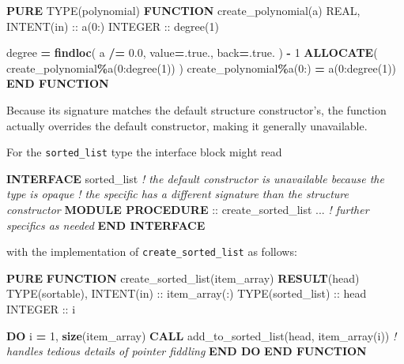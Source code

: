 \documentclass[
  paper=a4,
  ,captions=tableheading
]{scrartcl}
\newenvironment{Shaded}{\begin{snugshade}}{\end{snugshade}}
\newcommand{\CommentTok}[1]{\textcolor[rgb]{0.56,0.35,0.01}{\textit{#1}}}
\newcommand{\ConstantTok}[1]{\textcolor[rgb]{0.56,0.35,0.01}{#1}}
\newcommand{\DataTypeTok}[1]{\textcolor[rgb]{0.13,0.29,0.53}{#1}}
\newcommand{\DecValTok}[1]{\textcolor[rgb]{0.00,0.00,0.81}{#1}}
\newcommand{\FloatTok}[1]{\textcolor[rgb]{0.00,0.00,0.81}{#1}}
\newcommand{\FunctionTok}[1]{\textcolor[rgb]{0.13,0.29,0.53}{\textbf{#1}}}
\newcommand{\KeywordTok}[1]{\textcolor[rgb]{0.13,0.29,0.53}{\textbf{#1}}}
\newcommand{\NormalTok}[1]{#1}
\newcommand{\OperatorTok}[1]{\textcolor[rgb]{0.81,0.36,0.00}{\textbf{#1}}}
\begin{document}
\begin{Shaded}
\begin{Highlighting}[]
\KeywordTok{PURE} \DataTypeTok{TYPE(polynomial)} \KeywordTok{FUNCTION}\NormalTok{ create\_polynomial(a)}
   \DataTypeTok{REAL}\NormalTok{, }\DataTypeTok{INTENT(in)} \DataTypeTok{::}\NormalTok{ a(}\DecValTok{0}\NormalTok{:)}
   \DataTypeTok{INTEGER} \DataTypeTok{::}\NormalTok{ degree(}\DecValTok{1}\NormalTok{)}

\NormalTok{   degree }\KeywordTok{=} \FunctionTok{findloc}\NormalTok{( a }\OperatorTok{/=} \FloatTok{0.0}\NormalTok{, }\DataTypeTok{value}\KeywordTok{=}\ConstantTok{.true.}\NormalTok{, back}\KeywordTok{=}\ConstantTok{.true.}\NormalTok{ ) }\KeywordTok{{-}} \DecValTok{1}
   \KeywordTok{ALLOCATE}\NormalTok{( create\_polynomial}\OperatorTok{\%}\NormalTok{a(}\DecValTok{0}\NormalTok{:degree(}\DecValTok{1}\NormalTok{)) )}
\NormalTok{   create\_polynomial}\OperatorTok{\%}\NormalTok{a(}\DecValTok{0}\NormalTok{:) }\KeywordTok{=}\NormalTok{ a(}\DecValTok{0}\NormalTok{:degree(}\DecValTok{1}\NormalTok{))}
\KeywordTok{END FUNCTION}
\end{Highlighting}
\end{Shaded}

Because its signature matches the default structure constructor's, the
function actually overrides the default constructor, making it generally
unavailable.

For the \texttt{sorted\_list} type the interface block might read

\begin{Shaded}
\begin{Highlighting}[]
\KeywordTok{INTERFACE}\NormalTok{ sorted\_list}
\CommentTok{! the default constructor is unavailable because the type is opaque}
\CommentTok{! the specific has a different signature than the structure constructor}
   \KeywordTok{MODULE PROCEDURE} \DataTypeTok{::}\NormalTok{ create\_sorted\_list}
\NormalTok{   ... }\CommentTok{! further specifics as needed}
\KeywordTok{END INTERFACE}
\end{Highlighting}
\end{Shaded}

with the implementation of \texttt{create\_sorted\_list} as follows:

\begin{Shaded}
\begin{Highlighting}[]
\KeywordTok{PURE} \KeywordTok{FUNCTION}\NormalTok{ create\_sorted\_list(item\_array) }\KeywordTok{RESULT}\NormalTok{(head)}
   \DataTypeTok{TYPE(sortable)}\NormalTok{, }\DataTypeTok{INTENT(in)} \DataTypeTok{::}\NormalTok{ item\_array(:)}
   \DataTypeTok{TYPE(sorted\_list)} \DataTypeTok{::}\NormalTok{ head}
   \DataTypeTok{INTEGER} \DataTypeTok{::}\NormalTok{ i}

   \KeywordTok{DO}\NormalTok{ i }\KeywordTok{=} \DecValTok{1}\NormalTok{, }\FunctionTok{size}\NormalTok{(item\_array)}
      \KeywordTok{CALL}\NormalTok{ add\_to\_sorted\_list(head, item\_array(i))}
      \CommentTok{! handles tedious details of pointer fiddling}
   \KeywordTok{END DO}
\KeywordTok{END FUNCTION}
\end{Highlighting}
\end{Shaded}
\end{document}
